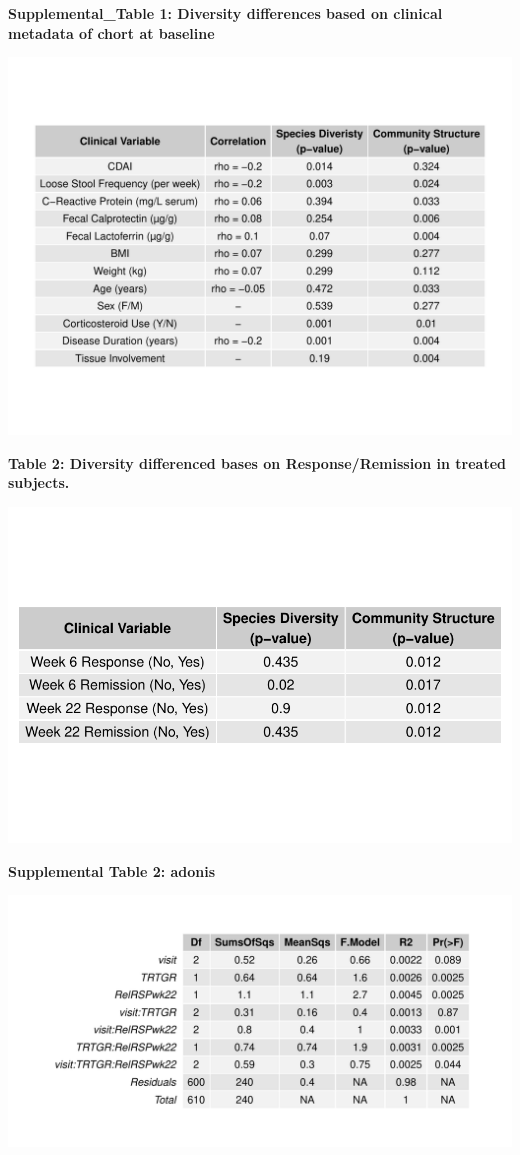 \documentclass[11pt,]{article}
\begin{document}
\newpage

\textbf{Supplemental\_Table 1: Diversity differences based on clinical
metadata of chort at baseline}

\includegraphics{tables/table1_cohortdiversity.pdf}

\newpage

\textbf{Table 2: Diversity differenced bases on Response/Remission in
treated subjects.}

\includegraphics{tables/table2diversity.pdf}

\newpage

\textbf{Supplemental Table 2: adonis}

\includegraphics{tables/SF2adonis.pdf}
\end{document}

